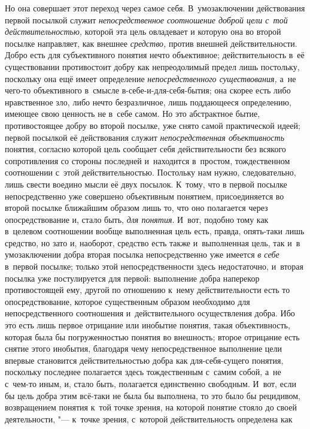 Но она совершает этот переход через самое себя.
В~умозаключении действования первой посылкой служит
{\em непосредственное соотношение доброй
цели с~той действительностью,} которой эта цель овладевает и
которую она во второй посылке направляет, как внешнее {\em средство,} против
внешней действительности. Добро есть для субъективного понятия нечто
объективное; действительность в~её существовании противостоит добру как
непреодолимый предел лишь постольку, поскольку она ещё имеет определение
{\em непосредственного существования,}
а~не чего-то объективного в~смысле в-себе-и-для-себя-бытия;
она скорее есть либо нравственное зло, либо нечто безразличное, лишь
поддающееся определению, имеющее свою ценность не в~себе самом. Но это
абстрактное бытие, противостоящее добру во второй посылке,
уже снято самой практической идеей; первой посылкой её действования служит
{\em непосредственная объективность}
понятия, согласно которой цель сообщает себя действительности
без всякого сопротивления со стороны последней и~находится в~простом,
тождественном соотношении с~этой действительностью. Постольку нам нужно,
следовательно, лишь свести воедино мысли её двух посылок. К~тому, что в
первой посылке непосредственно уже совершено объективным понятием,
присоединяется во второй посылке ближайшим образом лишь то, что оно
полагается через опосредствование и, стало быть,
{\em для понятия}. И~вот,
подобно тому как в~целевом соотношении вообще выполненная цель есть,
правда, опять-таки лишь средство, но зато и, наоборот, средство есть также
и~выполненная цель, так и~в умозаключении добра вторая посылка
непосредственно уже имеется {\em в
себе} в~первой посылке; только этой непосредственности здесь
недостаточно, и~вторая посылка уже постулируется для первой: выполнение
добра наперекор противостоящей ему, другой по отношению к~нему
действительности есть то опосредствование, которое существенным образом
необходимо для непосредственного соотношения и~действительного
осуществления добра. Ибо это есть лишь первое отрицание или инобытие
понятия, такая объективность, которая была бы погруженностью понятия во
внешность; второе отрицание есть снятие этого инобытия, благодаря чему
непосредственное выполнение цели впервые становится действительностью добра
как для-себя-сущего понятия, поскольку последнее полагается здесь
тождественным с~самим собой, а~не с~чем-то иным, и, стало быть,
полагается единственно свободным. И~вот, если бы цель добра этим всё-таки
не была бы выполнена, то это было бы рецидивом, возвращением понятия к~той
точке зрения, на которой понятие стояло до своей деятельности, "---
к~точке зрения, с~которой действительность определена как

